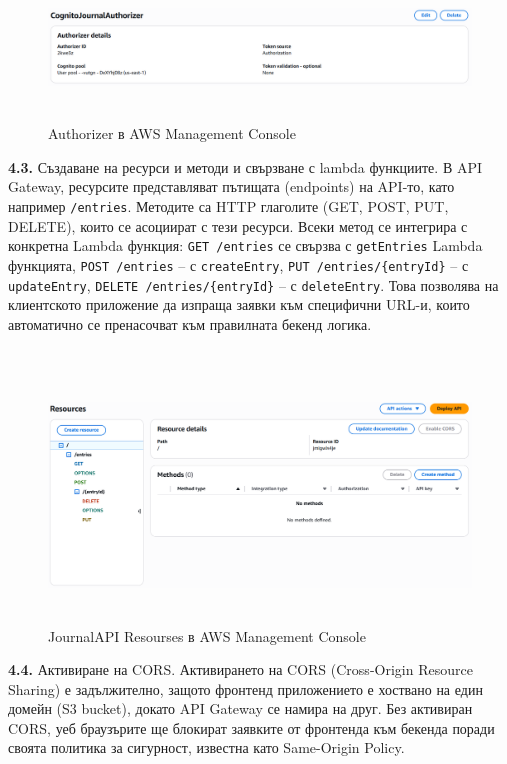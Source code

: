 \documentclass[12pt]{article}
\begin{document}
 \begin{figure}[H]
\centering
    \includegraphics[scale=0.4]{authorizer.png}
  \caption{Authorizer в AWS Management Console}
\end{figure}

\noindent\textbf{4.3.} Създаване на ресурси и методи и свързване с lambda функциите. В API Gateway, ресурсите представляват пътищата (endpoints) на API-то, като например \texttt{/entries}. Методите са HTTP глаголите (GET, POST, PUT, DELETE), които се асоциират с тези ресурси. Всеки метод се интегрира с конкретна Lambda функция: \texttt{GET /entries} се свързва с \texttt{getEntries} Lambda функцията, \texttt{POST /entries} – с \texttt{createEntry}, \texttt{PUT /entries/\{entryId\}} – с \texttt{updateEntry}, \texttt{DELETE /entries/\{entryId\}} – с \texttt{deleteEntry}. Това позволява на клиентското приложение да изпраща заявки към специфични URL-и, които автоматично се пренасочват към правилната бекенд логика.

 \begin{figure}[H]
\centering
    \includegraphics[scale=0.4]{api_resourses.png}
  \caption{JournalAPI Resourses в AWS Management Console}
\end{figure}

\noindent\textbf{4.4.} Активиране на CORS. Активирането на CORS (Cross-Origin Resource Sharing) е задължително, защото фронтенд приложението е хоствано на един домейн (S3 bucket), докато API Gateway се намира на друг. Без активиран CORS, уеб браузърите ще блокират заявките от фронтенда към бекенда поради своята политика за сигурност, известна като Same-Origin Policy.
\\
\end{document}
